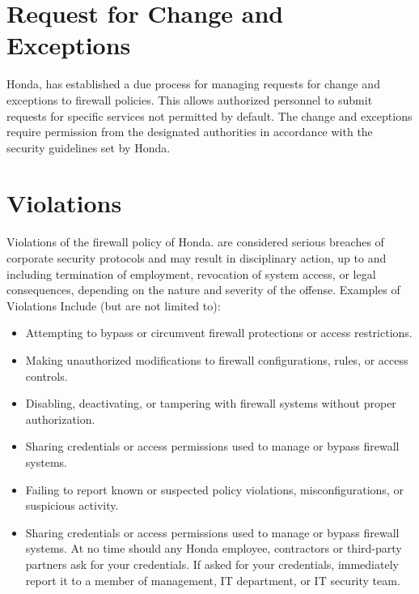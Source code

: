\section{Request for Change and Exceptions}
Honda, has established a due process for managing requests for change and exceptions to firewall policies. This allows authorized personnel to submit requests for specific services not permitted by default. The change and exceptions require permission from the designated authorities in accordance with the security guidelines set by Honda. 

\section{Violations}

Violations of the firewall policy of Honda. are considered serious breaches of corporate security protocols and may result in disciplinary action, up to and including termination of employment, revocation of system access, or legal consequences, depending on the nature and severity of the offense. Examples of Violations Include (but are not limited to):
\begin{itemize}
    \item Attempting to bypass or circumvent firewall protections or access restrictions.
    
    \item Making unauthorized modifications to firewall configurations, rules, or access controls.
    
    \item Disabling, deactivating, or tampering with firewall systems without proper authorization.

    \item Sharing credentials or access permissions used to manage or bypass firewall systems.
    
    \item Failing to report known or suspected policy violations, misconfigurations, or suspicious activity.

    \item Sharing credentials or access permissions used to manage or bypass firewall systems. At no time should any Honda employee, contractors or third-party partners ask for your credentials. If asked for your credentials, immediately report it to a member of management, IT department, or IT security team.
\end{itemize}



